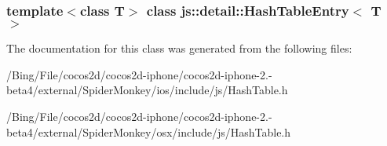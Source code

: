 \subsubsection*{template$<$class T$>$ class js\-::detail\-::\-Hash\-Table\-Entry$<$ T $>$}



The documentation for this class was generated from the following files\-:\begin{DoxyCompactItemize}
\item 
/\-Bing/\-File/cocos2d/cocos2d-\/iphone/cocos2d-\/iphone-\/2.-\/beta4/external/\-Spider\-Monkey/ios/include/js/Hash\-Table.\-h\item 
/\-Bing/\-File/cocos2d/cocos2d-\/iphone/cocos2d-\/iphone-\/2.-\/beta4/external/\-Spider\-Monkey/osx/include/js/Hash\-Table.\-h\end{DoxyCompactItemize}
